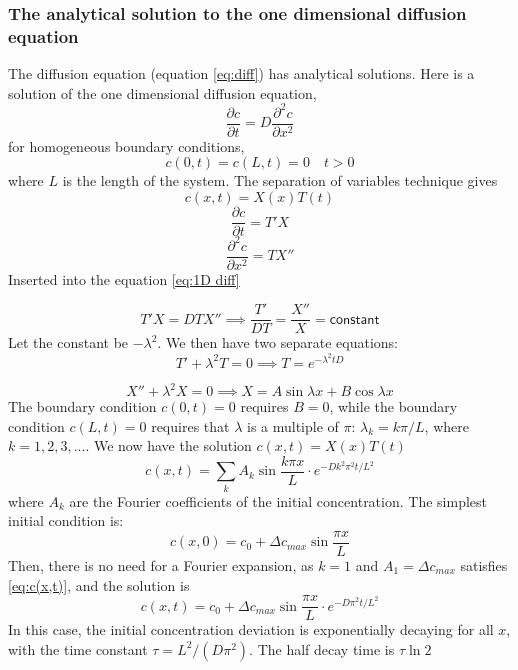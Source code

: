 \documentclass{article}
\begin{document}
\subsubsection{The analytical solution to the one dimensional diffusion equation}\label{analytical solution}
The diffusion equation (equation \ref{eq:diff}) has analytical solutions. Here is a solution of the one dimensional diffusion equation,
\begin{equation}\label{eq:1D diff}
\frac{\partial c}{\partial t} = D\frac{\partial^2 c}{\partial x^2}
\end{equation}
for homogeneous boundary conditions, 
$$c(0,t) = c(L,t)=0 \quad t>0$$ where $L$ is the length of the system. The separation of variables technique gives 
\begin{equation*}
c(x,t) = X(x)T(t)
\end{equation*}
\begin{equation*}
\frac{\partial c}{\partial t} = T'X
\end{equation*}
\begin{equation*}
\frac{\partial^2 c}{\partial x^2} = TX''
\end{equation*}
Inserted into the equation \ref{eq:1D diff}

\begin{equation*}
T'X  = DTX''\implies \frac{T'}{DT} = \frac{X''}{X} =\mathsf{ constant}
\end{equation*}
Let the constant be $-\lambda ^2$. We then have two separate equations:
\begin{equation*}
T' + \lambda^2 T = 0 \implies T=e^{-\lambda^2 tD}
\end{equation*}

\begin{equation*}
X'' + \lambda^2X = 0 \implies X=A \sin \lambda x + B\cos \lambda x
\end{equation*}
The boundary condition $c(0,t) = 0$ requires $B=0$, while the boundary condition $c(L,t)=0$ requires that $\lambda$ is a multiple of $\pi$: $\lambda_k = k\pi /L$, where $k = 1,2,3,...$. 
We now have the solution $c(x,t)=X(x)T(t)$
\begin{equation}\label{eq:c(x,t)}
c(x,t) = \sum_k A_k \sin \frac{k \pi x}{L}\cdot e^{-Dk^2\pi^2 t /L^2}
\end{equation}
where $A_k$ are the Fourier coefficients of the initial concentration.
The simplest initial condition is: 
$$c(x,0) =c_0 +  \Delta c_{max}\sin{\frac{\pi x}{L}}$$
Then, there is no need for a Fourier expansion, as $k=1$ and $A_1 = \Delta c_{max}$ satisfies \ref{eq:c(x,t)}, and the solution is
\begin{equation*}
c(x,t) =c_0 + \Delta c_{max} \sin \frac{ \pi x}{L}\cdot e^{-D\pi^2 t /L^2}
\end{equation*}
In this case, the initial concentration deviation is exponentially  decaying for all $x$, with the time constant $\tau = L^2/(D\pi^2)$. The half decay time is $\tau \ln 2$
\end{document}
